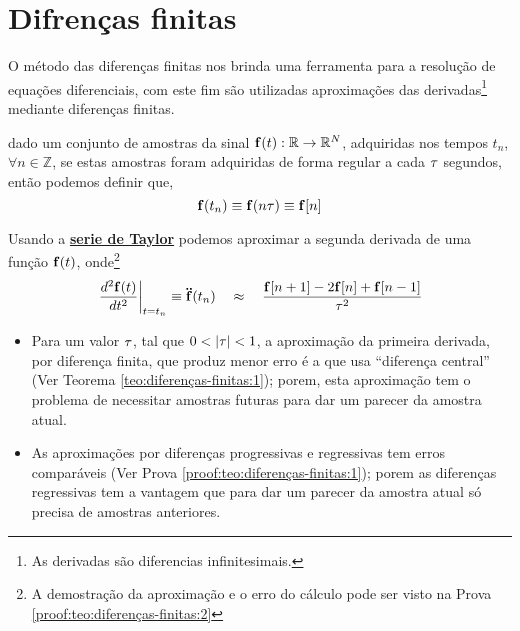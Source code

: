 \section{Difrenças finitas}

O método das diferenças finitas nos brinda uma ferramenta para a resolução de 
equações diferenciais, com este fim são utilizadas aproximações das derivadas\footnote{As 
derivadas são diferencias infinitesimais.} 
mediante diferenças finitas.

\begin{definition}
\label{def:diferenças-finitas:0}
dado um conjunto de amostras da sinal $\VECTOR{f}(t): \mathbb{R} \rightarrow \mathbb{R}^N$, 
adquiridas nos  tempos $t_n$, $\forall n \in \mathbb{Z}$, 
se estas amostras foram adquiridas de forma regular a cada $\tau$ segundos,
então podemos definir que,
\begin{equation}
\VECTOR{f}(t_n)\equiv \VECTOR{f}(n\tau) \equiv \VECTOR{f}[n]
\end{equation}
\end{definition}

\begin{theorem}
\label{teo:diferenças-finitas:2}
Usando a \hyperref[def:taylor]{\textbf{serie de Taylor}} podemos aproximar 
a segunda derivada de uma função $\VECTOR{f}(t)$, onde\footnote{A
demostração da aproximação e o erro do cálculo pode ser visto na Prova \ref{proof:teo:diferenças-finitas:2}}
\begin{equation}
\left.\frac{d^2\VECTOR{f}(t)}{dt^2}\right|_{t=t_n}\equiv \DDTVECTOR{f}(t_n)
\quad \approx \quad
\frac{\VECTOR{f}[n+1]-2\VECTOR{f}[n]+\VECTOR{f}[n-1]}{\ToS^2}  
\end{equation}
\end{theorem}

\begin{tcbattention}
\begin{itemize}
\item Para um valor $\tau$, tal que $0<|\ToS|<1$, a aproximação da primeira derivada, por diferença finita, 
que produz menor erro é a que usa ``diferença central'' (Ver Teorema \ref{teo:diferenças-finitas:1}); porem, 
esta aproximação tem o problema de necessitar amostras futuras para dar um parecer da amostra atual.
\item As aproximações por diferenças progressivas e regressivas tem erros comparáveis
 (Ver Prova \ref{proof:teo:diferenças-finitas:1});
porem as diferenças regressivas tem a vantagem que para dar um parecer da amostra atual só precisa de amostras anteriores.
\end{itemize}
\end{tcbattention}


